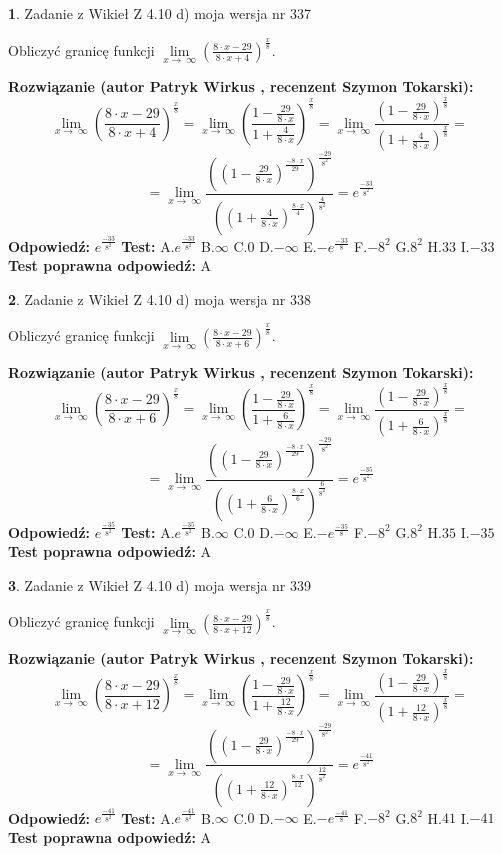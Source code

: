 \documentclass[12pt, a4paper]{article}
\theoremstyle{definition} %
\newtheorem{zad}{}
\newcommand{\zadStart}[1]{\begin{zad}#1\newline}
\newcommand{\zadStop}{\end{zad}}
\newcommand{\rozwStart}[2]{\noindent \textbf{Rozwiązanie (autor #1 , recenzent #2): }\newline}
\newcommand{\rozwStop}{\newline}
\newcommand{\odpStart}{\noindent \textbf{Odpowiedź:}\newline}
\newcommand{\odpStop}{\newline}
\newcommand{\testStart}{\noindent \textbf{Test:}\newline}
\newcommand{\testStop}{\newline}
\newcommand{\kluczStart}{\noindent \textbf{Test poprawna odpowiedź:}\newline}
\newcommand{\kluczStop}{\newline}
\begin{document}
\zadStart{Zadanie z Wikieł Z 4.10 d) moja wersja nr 337}


Obliczyć granicę funkcji  $\lim\limits_{x\to\ \infty}(\frac{8\cdot x-29}{8\cdot x+4})^{\frac{x}{8}}$.
\zadStop
\rozwStart{Patryk Wirkus}{Szymon Tokarski}
$$\lim\limits_{x\to\ \infty}(\frac{8\cdot x-29}{8\cdot x+4})^{\frac{x}{8}} = \lim\limits_{x\to\ \infty}(\frac{1-\frac{29}{8\cdot x}}{1+\frac{4}{8\cdot x}})^{\frac{x}{8}}=\lim\limits_{x\to\ \infty}\frac{(1-\frac{29}{8\cdot x})^{\frac{x}{8}}}{(1+\frac{4}{8\cdot x})^{\frac{x}{8}}}=$$
$$=\lim\limits_{x\to\ \infty}\frac{((1-\frac{29}{8\cdot x})^{\frac{-8\cdot x}{29}})^{\frac{-29}{8^{2}}}}{((1+\frac{4}{8\cdot x})^{\frac{8\cdot x}{4}})^{\frac{4}{8^{2}}}}=e^{\frac{-33}{8^{2}}}$$
\rozwStop
\odpStart
$e^{\frac{-33}{8^{2}}}$
\odpStop
\testStart
A.$e^{\frac{-33}{8^{2}}}$ B.$\infty$ C.$0$ D.$-\infty$ E.$-e^{\frac{-33}{8}}$
F.$-8^{2}$ G.$8^{2}$
H.$33$
I.$-33$
\testStop
\kluczStart
A
\kluczStop



\zadStart{Zadanie z Wikieł Z 4.10 d) moja wersja nr 338}


Obliczyć granicę funkcji  $\lim\limits_{x\to\ \infty}(\frac{8\cdot x-29}{8\cdot x+6})^{\frac{x}{8}}$.
\zadStop
\rozwStart{Patryk Wirkus}{Szymon Tokarski}
$$\lim\limits_{x\to\ \infty}(\frac{8\cdot x-29}{8\cdot x+6})^{\frac{x}{8}} = \lim\limits_{x\to\ \infty}(\frac{1-\frac{29}{8\cdot x}}{1+\frac{6}{8\cdot x}})^{\frac{x}{8}}=\lim\limits_{x\to\ \infty}\frac{(1-\frac{29}{8\cdot x})^{\frac{x}{8}}}{(1+\frac{6}{8\cdot x})^{\frac{x}{8}}}=$$
$$=\lim\limits_{x\to\ \infty}\frac{((1-\frac{29}{8\cdot x})^{\frac{-8\cdot x}{29}})^{\frac{-29}{8^{2}}}}{((1+\frac{6}{8\cdot x})^{\frac{8\cdot x}{6}})^{\frac{6}{8^{2}}}}=e^{\frac{-35}{8^{2}}}$$
\rozwStop
\odpStart
$e^{\frac{-35}{8^{2}}}$
\odpStop
\testStart
A.$e^{\frac{-35}{8^{2}}}$ B.$\infty$ C.$0$ D.$-\infty$ E.$-e^{\frac{-35}{8}}$
F.$-8^{2}$ G.$8^{2}$
H.$35$
I.$-35$
\testStop
\kluczStart
A
\kluczStop



\zadStart{Zadanie z Wikieł Z 4.10 d) moja wersja nr 339}


Obliczyć granicę funkcji  $\lim\limits_{x\to\ \infty}(\frac{8\cdot x-29}{8\cdot x+12})^{\frac{x}{8}}$.
\zadStop
\rozwStart{Patryk Wirkus}{Szymon Tokarski}
$$\lim\limits_{x\to\ \infty}(\frac{8\cdot x-29}{8\cdot x+12})^{\frac{x}{8}} = \lim\limits_{x\to\ \infty}(\frac{1-\frac{29}{8\cdot x}}{1+\frac{12}{8\cdot x}})^{\frac{x}{8}}=\lim\limits_{x\to\ \infty}\frac{(1-\frac{29}{8\cdot x})^{\frac{x}{8}}}{(1+\frac{12}{8\cdot x})^{\frac{x}{8}}}=$$
$$=\lim\limits_{x\to\ \infty}\frac{((1-\frac{29}{8\cdot x})^{\frac{-8\cdot x}{29}})^{\frac{-29}{8^{2}}}}{((1+\frac{12}{8\cdot x})^{\frac{8\cdot x}{12}})^{\frac{12}{8^{2}}}}=e^{\frac{-41}{8^{2}}}$$
\rozwStop
\odpStart
$e^{\frac{-41}{8^{2}}}$
\odpStop
\testStart
A.$e^{\frac{-41}{8^{2}}}$ B.$\infty$ C.$0$ D.$-\infty$ E.$-e^{\frac{-41}{8}}$
F.$-8^{2}$ G.$8^{2}$
H.$41$
I.$-41$
\testStop
\kluczStart
A
\kluczStop
\end{document}
